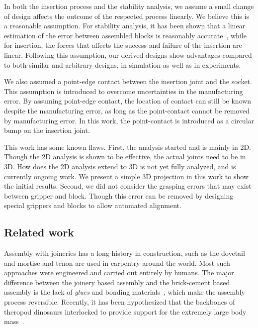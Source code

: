\documentclass[letterpaper, 10 pt, conference]{ieeeconf}
\begin{document}
In both the insertion process and the stability analysis, we assume a small change of design affects the outcome of the respected process linearly. We believe this is a reasonable assumption. For stability analysis, it has been shown that a linear estimation of the error between assembled blocks is reasonably accurate~\cite{}, while for insertion, the forces that affects the success and failure of the insertion are linear. Following this assumption, our derived designs show advantages compared to both similar and arbitrary designs, in simulation as well as in experiments. 

We also assumed a point-edge contact between the insertion joint and the socket. This assumption is introduced to overcome uncertainties in the manufacturing error. By assuming point-edge contact, the location of contact can still be known despite the manufacturing error, as long as the point-contact cannot be removed by manufacturing error. In this work, the point-contact is introduced as a circular bump on the insertion joint. 

This work has some known flaws. First, the analysis started and is mainly in 2D. Though the 2D analysis is shown to be effective, the actual joints need to be in 3D. How does the 2D analysis extend to 3D is not yet fully analyzed, and is currently ongoing work. We present a simple 3D projection in this work to show the initial results. Second, we did not consider the grasping errors that may exist between gripper and block. Though this error can be removed by designing special grippers and blocks to allow automated alignment. 



\subsection{Related work}


Assembly with joineries has a long history in construction, such as the dovetail and mortise and tenon are used in carpentry around the world. Most such approaches were engineered and carried out entirely by humans. The major difference between the joinery based assembly and the brick-cement based assembly is the lack of {\em glues} and bonding materials~\cite{zwerger2012wood}, which make the assembly process reversible. Recently, it has been hypothesized that the backbones of theropod dinosaurs interlocked to provide support for the extremely large body mass~\cite{woodruff2016}.
\end{document}
